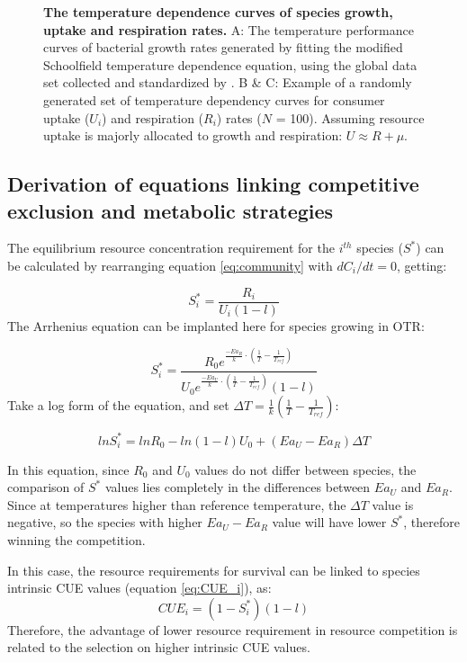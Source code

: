 \begin{figure}[H]
    \caption{\textbf{The temperature dependence curves of species growth, uptake and respiration rates.} A: The temperature performance curves of bacterial growth rates generated by fitting the modified Schoolfield temperature dependence equation, using the global data set collected and standardized by \cite{smith2019community}. B \& C: Example of a randomly generated set of temperature dependency curves for consumer uptake ($U_i$) and respiration ($R_i$) rates ($N$ = 100). Assuming resource uptake is majorly allocated to growth and respiration: $U \approx R + \mu$.}
    \label{fig:G}
\end{figure}

\subsection{Derivation of equations linking competitive exclusion and metabolic strategies}\label{sec:S+CUE}

The equilibrium resource concentration requirement for the $i^{th}$ species ($S^*$) can be calculated by rearranging equation \ref{eq:community} with $dC_i/dt = 0$, getting:

\begin{equation*}\label{eq:S*}
S^*_i = \frac{R_i}{U_i(1-l)}
\end{equation*}
The Arrhenius equation can be implanted here for species growing in OTR:

\begin{equation*}
S^*_i = \frac{R_0 e^{\frac{-Ea_R}{k}\cdot\left(\frac{1}{T} - \frac{1}{T_{ref}}\right)}}{U_0 e^{\frac{-Ea_U}{k}\cdot\left(\frac{1}{T} - \frac{1}{T_{ref}}\right)} (1-l)}
\end{equation*}
Take a log form of the equation, and set $\Delta T = \frac{1}{k}\left(\frac{1}{T} - \frac{1}{T_{ref}}\right) $:

\begin{equation*}
lnS^*_i = lnR_0 - ln(1-l)U_0 + (Ea_U - Ea_R) \Delta T
\end{equation*}

In this equation, since $R_0$ and $U_0$ values do not differ between species, the comparison of $S^*$ values lies completely in the differences between $Ea_U$ and $Ea_R$. Since at temperatures higher than reference temperature, the $\Delta T$ value is negative, so the species with higher $Ea_U - Ea_R$ value will have lower $S^*$, therefore winning the competition. 

In this case, the resource requirements for survival can be linked to species intrinsic CUE values (equation \ref{eq:CUE_i}), as:
\begin{equation}\label{eq:S_CUE}
CUE_i = (1 - S^*_i) (1-l)
\end{equation}
Therefore, the advantage of lower resource requirement in resource competition is related to the selection on higher intrinsic CUE values.

